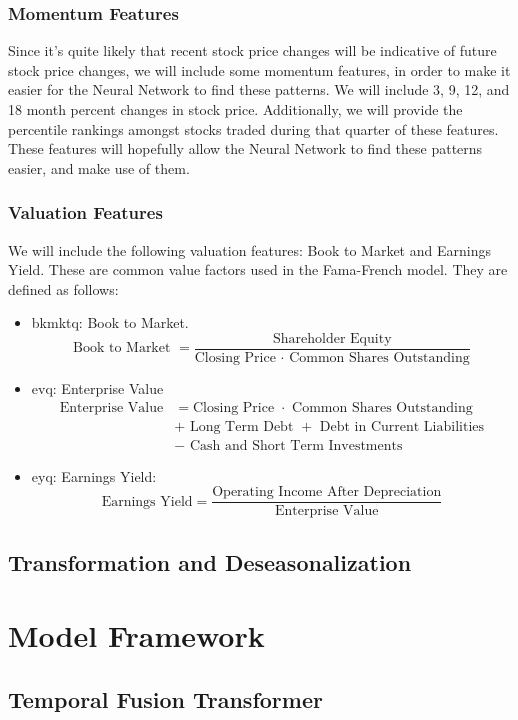 \documentclass[AER]{AEA}
\begin{document}
\subsubsection{Momentum Features}
Since it's quite likely that recent stock price changes will be indicative of future stock price changes,
we will include some momentum features, in order to make it easier for the Neural Network to find these patterns.
We will include 3, 9, 12, and 18 month percent changes in stock price.
Additionally, we will provide the percentile rankings amongst stocks traded during that quarter of these features.
These features will hopefully allow the Neural Network to find these patterns easier, and make use of them.
\subsubsection{Valuation Features}
We will include the following valuation features: Book to Market and Earnings Yield.
These are common value factors used in the Fama-French model.
They are defined as follows:
\begin{itemize}
    \item 
        bkmktq: Book to Market.
        $$\text{Book to Market } = \frac{\text{Shareholder Equity}}{\text{Closing Price } \cdot \text{ Common Shares Outstanding}} $$
    \item
        evq: Enterprise Value
        \begin{align*}
        \text{Enterprise Value} &= \text{Closing Price } \cdot \text{ Common Shares Outstanding}\\
        &+ \text{ Long Term Debt } + \text{ Debt in Current Liabilities}\\
        &- \text{ Cash and Short Term Investments}
        \end{align*}
    \item
        eyq: Earnings Yield:
        $$
        \text{Earnings Yield} = \frac{\text{Operating Income After Depreciation}}{\text{Enterprise Value}}
        $$
\end{itemize}
\subsection{Transformation and Deseasonalization}
\section{Model Framework}
\subsection{Temporal Fusion Transformer}
\end{document}
